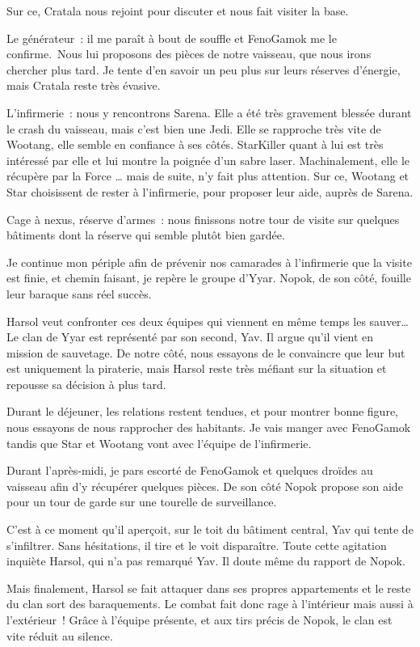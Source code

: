 \documentclass[a4paper,9pt,twoside,twocolumn,openany]{book}
\begin{document}
Sur ce, Cratala nous rejoint pour discuter et nous fait visiter la base.

Le générateur\ : il me paraît à bout de souffle et FenoGamok me le confirme.\ Nous lui proposons des pièces de notre vaisseau, que nous irons chercher plus tard. Je tente d’en savoir un peu plus sur leurs réserves d’énergie, mais Cratala reste très évasive.

L’infirmerie\ : nous y rencontrons Sarena. Elle a été très gravement blessée durant le crash du vaisseau, mais c’est bien une Jedi. Elle se rapproche très vite de Wootang, elle semble en confiance à ses côtés. StarKiller quant à lui est très intéressé par elle et lui montre la poignée d’un sabre laser. Machinalement, elle le récupère par la Force … mais de suite, n’y fait plus attention. Sur ce, Wootang et Star choisissent de rester à l’infirmerie, pour proposer leur aide, auprès de Sarena.

Cage à nexus, réserve d’armes\ : nous finissons notre tour de visite sur quelques bâtiments dont la réserve qui semble plutôt bien gardée.

Je continue mon périple afin de prévenir nos camarades à l’infirmerie que la visite est finie, et chemin faisant, je repère le groupe d’Yyar. Nopok, de son côté, fouille leur baraque sans réel succès.

Harsol veut confronter ces deux équipes qui viennent en même temps les sauver… Le clan de Yyar est représenté par son second, Yav. Il argue qu’il vient en mission de sauvetage. De notre côté, nous essayons de le convaincre que leur but est uniquement la piraterie, mais Harsol reste très méfiant sur la situation et repousse sa décision à plus tard.

Durant le déjeuner, les relations restent tendues, et pour montrer bonne figure, nous essayons de nous rapprocher des habitants. Je vais manger avec FenoGamok tandis que Star et Wootang vont avec l’équipe de l’infirmerie.

Durant l’après-midi, je pars escorté de FenoGamok et quelques droïdes au vaisseau afin d’y récupérer quelques pièces. De son côté Nopok propose son aide pour un tour de garde sur une tourelle de surveillance.

C’est à ce moment qu’il aperçoit, sur le toit du bâtiment central, Yav qui tente de s’infiltrer. Sans hésitations, il tire et le voit disparaître. Toute cette agitation inquiète Harsol, qui n’a pas remarqué Yav. Il doute même du rapport de Nopok.

Mais finalement, Harsol se fait attaquer dans ses propres appartements et le reste du clan sort des baraquements. Le combat fait donc rage à l’intérieur mais aussi à l’extérieur\ ! Grâce à l’équipe présente, et aux tirs précis de Nopok, le clan est vite réduit au silence.
\end{document}
